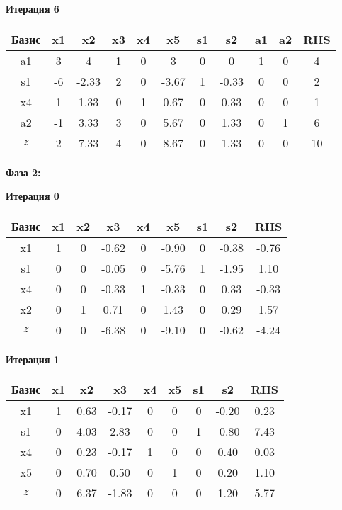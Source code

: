 \documentclass[a4paper,12pt]{article}
\begin{document}
 \textbf{Итерация 6}\\
\begin{tabular}{|c|c|c|c|c|c|c|c|c|c|c|}
\hline
Базис & x1 & x2 & x3 & x4 & x5 & s1 & s2 & a1 & a2 & RHS \\ \hline
a1 & 3 & 4 & 1 & 0 & 3 & 0 & 0 & 1 & 0 & 4 \\ \hline
s1 & -6 & -2.33 & 2 & 0 & -3.67 & 1 & -0.33 & 0 & 0 & 2 \\ \hline
x4 & 1 & 1.33 & 0 & 1 & 0.67 & 0 & 0.33 & 0 & 0 & 1 \\ \hline
a2 & -1 & 3.33 & 3 & 0 & 5.67 & 0 & 1.33 & 0 & 1 & 6 \\ \hline
$z$ & 2 & 7.33 & 4 & 0 & 8.67 & 0 & 1.33 & 0 & 0 & 10 \\ \hline
\end{tabular}
\vspace{5mm}

\textbf{Фаза 2:}


 \textbf{Итерация 0}\\
\begin{tabular}{|c|c|c|c|c|c|c|c|c|}
\hline
Базис & x1 & x2 & x3 & x4 & x5 & s1 & s2 & RHS \\ \hline
x1 & 1 & 0 & -0.62 & 0 & -0.90 & 0 & -0.38 & -0.76 \\ \hline
s1 & 0 & 0 & -0.05 & 0 & -5.76 & 1 & -1.95 & 1.10 \\ \hline
x4 & 0 & 0 & -0.33 & 1 & -0.33 & 0 & 0.33 & -0.33 \\ \hline
x2 & 0 & 1 & 0.71 & 0 & 1.43 & 0 & 0.29 & 1.57 \\ \hline
$z$ & 0 & 0 & -6.38 & 0 & -9.10 & 0 & -0.62 & -4.24 \\ \hline
\end{tabular}
\vspace{5mm}

 \textbf{Итерация 1}\\
\begin{tabular}{|c|c|c|c|c|c|c|c|c|}
\hline
Базис & x1 & x2 & x3 & x4 & x5 & s1 & s2 & RHS \\ \hline
x1 & 1 & 0.63 & -0.17 & 0 & 0 & 0 & -0.20 & 0.23 \\ \hline
s1 & 0 & 4.03 & 2.83 & 0 & 0 & 1 & -0.80 & 7.43 \\ \hline
x4 & 0 & 0.23 & -0.17 & 1 & 0 & 0 & 0.40 & 0.03 \\ \hline
x5 & 0 & 0.70 & 0.50 & 0 & 1 & 0 & 0.20 & 1.10 \\ \hline
$z$ & 0 & 6.37 & -1.83 & 0 & 0 & 0 & 1.20 & 5.77 \\ \hline
\end{tabular}
\vspace{5mm}
\end{document}
